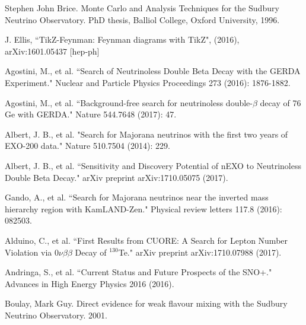 \documentclass[preprint,12pt]{elsarticle}
\begin{document}
\begin{thebibliography}{00}
 Stephen John Brice. Monte Carlo and Analysis Techniques for the Sudbury Neutrino Observatory. PhD thesis, Balliol College, Oxford University, 1996.


J. Ellis, ``TikZ-Feynman: Feynman diagrams with TikZ", (2016), arXiv:1601.05437 [hep-ph]


 Agostini, M., et al. ``Search of Neutrinoless Double Beta Decay with the GERDA Experiment." Nuclear and Particle Physics Proceedings 273 (2016): 1876-1882. 

 Agostini, M., et al. ``Background-free search for neutrinoless double-$\beta$ decay of 76 Ge with GERDA." Nature 544.7648 (2017): 47.

 Albert, J. B., et al. "Search for Majorana neutrinos with the first two years of EXO-200 data." Nature 510.7504 (2014): 229.

 Albert, J. B., et al. ``Sensitivity and Discovery Potential of nEXO to Neutrinoless Double Beta Decay." arXiv preprint arXiv:1710.05075 (2017).


 Gando, A., et al. ``Search for Majorana neutrinos near the inverted mass hierarchy region with KamLAND-Zen." Physical review letters 117.8 (2016): 082503.

 Alduino, C., et al. ``First Results from CUORE: A Search for Lepton Number Violation via $0\nu\beta\beta$ Decay of $^{130}$Te." arXiv preprint arXiv:1710.07988 (2017).



 Andringa, S., et al. ``Current Status and Future Prospects of the SNO+." Advances in High Energy Physics 2016 (2016).

 Boulay, Mark Guy. Direct evidence for weak flavour mixing with the Sudbury Neutrino Observatory. 2001.



\end{thebibliography}
\end{document}
